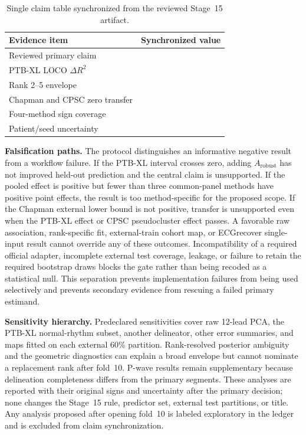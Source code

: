 \documentclass{article}
\newcommand{\resultcell}[1]{\begingroup\renewcommand{\text}[1]{##1}#1\endgroup}
\begin{document}
\begin{table}[t]
\centering
\caption{Single claim table synchronized from the reviewed Stage~15 artifact.}
\label{tab:evidence}
\footnotesize
\setlength{\tabcolsep}{2.5pt}
\begin{tabular}{L{0.43\columnwidth}L{0.49\columnwidth}}
\toprule
Evidence item & Synchronized value \\
\midrule
Reviewed primary claim & \resultcell{\ResultPrimaryAssociation} \\
PTB-XL LOCO $\Delta R^2$ & \resultcell{\ResultIncrementalValue} \\
Rank 2--5 envelope & \resultcell{\ResultRankWeightStability} \\
Chapman and CPSC zero transfer & \resultcell{\ResultExternalAssociation} \\
Four-method sign coverage & \resultcell{\ResultModelCoverage} \\
Patient/seed uncertainty & \resultcell{\ResultBootstrapUncertainty} \\
\bottomrule
\end{tabular}
\end{table}

\noindent\textbf{Falsification paths.}  The protocol distinguishes an informative negative result
from a workflow failure.  If the PTB-XL interval crosses zero, adding
$A_{\mathrm{robust}}$ has not improved held-out prediction and the central claim is unsupported.
If the pooled effect is positive but fewer than three common-panel methods have positive point
effects, the result is too method-specific for the proposed scope.  If the Chapman external lower
bound is not positive, transfer is unsupported even when the PTB-XL effect or CPSC pseudocluster
effect passes.  A favorable raw
association, rank-specific fit, external-train cohort map, or ECGrecover single-input result cannot
override any of these outcomes.  Incompatibility of a required official adapter, incomplete external
test coverage, leakage, or failure to retain the required bootstrap draws blocks the gate rather than
being recoded as a statistical null.  This separation prevents implementation failures from being
used selectively and prevents secondary evidence from rescuing a failed primary estimand.

\noindent\textbf{Sensitivity hierarchy.}  Predeclared sensitivities cover raw 12-lead PCA, the
PTB-XL normal-rhythm subset, another delineator, other error summaries, and maps fitted on each
external 60\% partition.  Rank-resolved posterior ambiguity and the geometric
diagnostics can explain a broad envelope but cannot nominate a replacement rank after fold~10.
P-wave results remain supplementary because delineation completeness differs from the primary
segments.  These analyses are reported with their original signs and uncertainty after the primary
decision; none changes the Stage~15 rule, predictor set, external test partitions, or title.  Any
analysis proposed after opening fold~10 is labeled exploratory in the ledger and is excluded from
claim synchronization.
\end{document}
